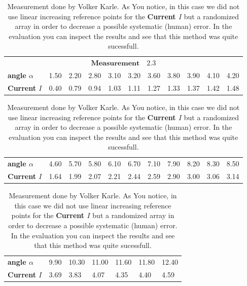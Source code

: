     \begin{table}[htdp]
        \begin{tabular}{|l||p{1.1cm}|p{1.1cm}|p{1.1cm}|p{1.1cm}|p{1.1cm}|p{1.1cm}|p{1.1cm}|p{1.1cm}|p{1.1cm}|p{1.1cm}|}
        \hline
            \multicolumn{11}{|c|}{\cellcolor[RGB]{206,250,201}$
            \mathbf{Measurement \quad 2.3}$} \\
\textbf{angle $\alpha$}& 1.50& 2.20& 2.80& 3.10& 3.20& 3.60& 3.80& 3.90& 4.10& 4.20 \\
\textbf{Current $I$}& 0.40& 0.79& 0.94& 1.03& 1.11& 1.27& 1.33& 1.37& 1.42& 1.48 \\

        \hline
        \end{tabular}
        \begin{tabular}{|l||p{1.1cm}|p{1.1cm}|p{1.1cm}|p{1.1cm}|p{1.1cm}|p{1.1cm}|p{1.1cm}|p{1.1cm}|p{1.1cm}|p{1.1cm}|}
        \hline\textbf{angle $\alpha$}& 4.60& 5.70& 5.80& 6.10& 6.70& 7.10& 7.90& 8.20& 8.30& 8.50 \\
\textbf{Current $I$}& 1.64& 1.99& 2.07& 2.21& 2.44& 2.59& 2.90& 3.00& 3.06& 3.14 \\

        \hline
        \end{tabular}
    \begin{tabular}{|l||p{1.1cm}|p{1.1cm}|p{1.1cm}|p{1.1cm}|p{1.1cm}|p{1.1cm}|}
    \hline\textbf{angle $\alpha$}& 9.90& 10.30& 11.00& 11.60& 11.80& 12.40 \\
\textbf{Current $I$}& 3.69& 3.83& 4.07& 4.35& 4.40& 4.59 \\

    \hline
    \end{tabular}
    \caption{Measurement done by Volker Karle. As You notice, in this case we did not use linear
        increasing reference points for the \textbf{Current $I$} but a randomized array
        in order to decrease a possible systematic (human) error. In the evaluation you 
        can inspect the results and see that this method was quite sucessfull.}
    \label{Power05}
    \end{table}

